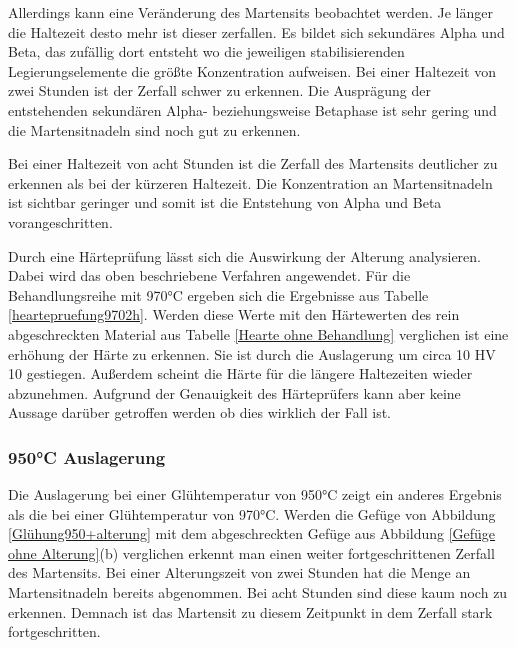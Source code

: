 \documentclass[a4paper, 11pt]{tubsreprt}
\begin{document}
Allerdings kann eine Veränderung des Martensits beobachtet werden. Je länger die Haltezeit desto mehr ist dieser zerfallen. Es bildet sich sekundäres Alpha und Beta, das zufällig dort entsteht wo die jeweiligen stabilisierenden Legierungselemente die größte Konzentration aufweisen. Bei einer Haltezeit von zwei Stunden ist der Zerfall schwer zu erkennen. Die Ausprägung der entstehenden sekundären Alpha- beziehungsweise Betaphase ist sehr gering und die Martensitnadeln sind noch gut zu erkennen. 

Bei einer Haltezeit von acht Stunden ist die Zerfall des Martensits deutlicher zu erkennen als bei der kürzeren Haltezeit. Die Konzentration an Martensitnadeln ist sichtbar geringer und somit ist die Entstehung von Alpha und Beta vorangeschritten. 

Durch eine Härteprüfung lässt sich die Auswirkung der Alterung analysieren. Dabei wird das oben beschriebene Verfahren angewendet. Für die Behandlungsreihe mit 970°C ergeben sich die Ergebnisse aus Tabelle \ref{heartepruefung9702h}. Werden diese Werte mit den Härtewerten des rein abgeschreckten Material aus Tabelle \ref{Hearte ohne Behandlung} verglichen ist eine erhöhung der Härte zu erkennen. Sie ist durch die Auslagerung um circa 10 HV 10 gestiegen. Außerdem scheint die Härte für die längere Haltezeiten wieder abzunehmen. Aufgrund der Genauigkeit des Härteprüfers kann aber keine Aussage darüber getroffen werden ob dies wirklich der Fall ist. 

\subsubsection{950°C Auslagerung}
Die Auslagerung bei einer Glühtemperatur von 950°C zeigt ein anderes Ergebnis als die bei einer Glühtemperatur von 970°C. Werden die Gefüge von Abbildung  \ref{Glühung950+alterung} mit dem abgeschreckten Gefüge aus Abbildung \ref{Gefüge ohne Alterung}(b) verglichen erkennt man einen weiter fortgeschrittenen Zerfall des Martensits. Bei einer Alterungszeit von zwei Stunden hat die Menge an Martensitnadeln bereits abgenommen. Bei acht Stunden sind diese kaum noch zu erkennen. Demnach ist das Martensit zu diesem Zeitpunkt in dem Zerfall stark fortgeschritten. 
\end{document}
